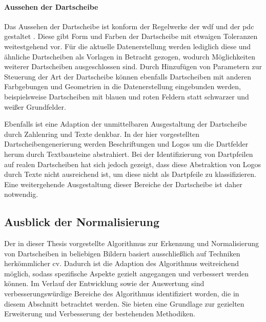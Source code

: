 \vspace*{-0.15cm}
\paragraph{Aussehen der Dartscheibe}

Das Aussehen der Dartscheibe ist konform der Regelwerke der \ac{wdf} und der \ac{pdc} gestaltet \cite{wdf-rules,pdc_rules}. Diese gibt Form und Farben der Dartscheibe mit etwaigen Toleranzen weitestgehend vor. Für die aktuelle Datenerstellung werden lediglich diese und ähnliche Dartscheiben als Vorlagen in Betracht gezogen, wodurch Möglichkeiten weiterer Dartscheiben ausgeschlossen sind. Durch Hinzufügen von Parametern zur Steuerung der Art der Dartscheibe können ebenfalls Dartscheiben mit anderen Farbgebungen und Geometrien in die Datenerstellung eingebunden werden, beispielsweise Dartscheiben mit blauen und roten Feldern statt schwarzer und weißer Grundfelder.

Ebenfalls ist eine Adaption der unmittelbaren Ausgestaltung der Dartscheibe durch Zahlenring und Texte denkbar. In der hier vorgestellten Dartscheibengenerierung werden Beschriftungen und Logos um die Dartfelder herum durch Textbausteine abstrahiert. Bei der Identifizierung von Dartpfeilen auf realen Dartscheiben hat sich jedoch gezeigt, dass diese Abstraktion von Logos durch Texte nicht ausreichend ist, um diese nicht als Dartpfeile zu klassifizieren. Eine weitergehende Ausgestaltung dieser Bereiche der Dartscheibe ist daher notwendig.



\vspace*{-0.15cm}
\subsection{Ausblick der Normalisierung}
\label{sec:ausblick_cv}

Der in dieser Thesis vorgestellte Algorithmus zur Erkennung und Normalisierung von Dartscheiben in beliebigen Bildern basiert ausschließlich auf Techniken herkömmlicher \ac{cv}. Dadurch ist die Adaption des Algorithmus weitreichend möglich, sodass spezifische Aspekte gezielt angegangen und verbessert werden können. Im Verlauf der Entwicklung sowie der Auswertung sind verbesserungswürdige Bereiche des Algorithmus identifiziert worden, die in diesem Abschnitt betrachtet werden. Sie bieten eine Grundlage zur gezielten Erweiterung und Verbesserung der bestehenden Methodiken.

